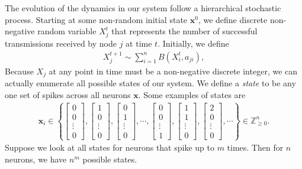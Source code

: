 \documentclass[superscriptaddress]{revtex4-1}
\begin{document}
The evolution of the dynamics in our system follow a hierarchical stochastic process. Starting at some non-random initial state $\bm{x}^0$, we define discrete non-negative random variable $X_{j}^t$ that represents the number of successful transmissions received by node $j$ at time $t$. Initially, we define
\begin{align*}
X_j^{t+1} \sim \sum_{i=1}^n B(X_i^{t},a_{ji}),
\end{align*}
Because $X_j$ at any point in time must be a non-negative discrete integer, we can actually enumerate all possible states of our system. We define a \emph{state} to be any one set of spikes across all neurons $\bm{x}$. Some examples of states are
\begin{align*}
\bm{x}_i \in
\left\{ 
\begin{bmatrix}
0 \\ 0 \\ \vdots \\ 0
\end{bmatrix},
\begin{bmatrix}
1 \\ 0 \\ \vdots \\ 0
\end{bmatrix},
\begin{bmatrix}
0 \\ 1 \\ \vdots \\ 0
\end{bmatrix},
\dotsm,
\begin{bmatrix}
0 \\ 0 \\ \vdots \\ 1
\end{bmatrix},
\begin{bmatrix}
1 \\ 1 \\ \vdots \\ 0
\end{bmatrix},
\begin{bmatrix}
2 \\ 0 \\ \vdots \\ 0
\end{bmatrix},
\dotsm
\right\}
\in
\mathbb{Z}_{\geq 0}^n.
\end{align*}
Suppose we look at all states for neurons that spike up to $m$ times. Then for $n$ neurons, we have $n^m$ possible states.
\end{document}

